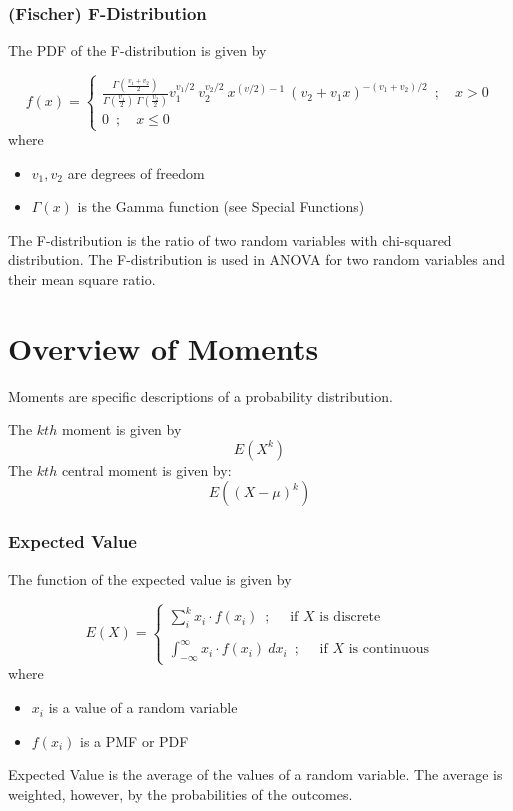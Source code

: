 \documentclass{article}
\begin{document}
\subsubsection{(Fischer) F-Distribution}

The PDF of the F-distribution is given by

$$ f(x) = \begin{cases} \frac{\Gamma (\frac{v_1 + v_2}{2}) }{ \Gamma (\frac{v_1}{2}) \:  \Gamma (\frac{v_2}{2})  } v_1^{v_1/2} \: v_2^{ v_2/2} \: x^{ (v / 2)-1 } \: (v_2 + v_1 x)^{-(v_1 + v_2)/2} \enspace ; \quad x > 0 \\ 0 \enspace ; \quad x \leq 0 \end{cases} $$
\hfill \break
where
\begin{itemize}
    \item $v_1, v_2$ are degrees of freedom
    \item $\Gamma(x)$ is the Gamma function (see Special Functions)
\end{itemize}
\hfill \break
The F-distribution is the ratio of two random variables with chi-squared distribution. The F-distribution is used in ANOVA for two random variables and their mean square ratio.



\newpage
\section{Overview of Moments}
Moments are specific descriptions of a probability distribution. 

\hfill \break
\hfill \break
The $kth$ moment is given by
$$ E(X^k) $$ \hfill \break
The $kth$ central moment is given by:
$$ E((X-\mu)^k) $$

\subsubsection{Expected Value}
The function of the expected value is given by

$$ E(X) = \begin{cases} \sum_{i}^{k} x_i \cdot f(x_i) \enspace ; \quad \text{ if } X \text{ is discrete} \\ \\ \int_{-\infty}^{\infty} x_i \cdot f(x_i) \: dx_i \enspace ; \quad \text{ if } X \text{ is continuous} \end{cases} $$ \hfill \break
where
\begin{itemize}
    \item $x_i$ is a value of a random variable
    \item $f(x_i)$ is a PMF or PDF
\end{itemize}
\hfill \break
Expected Value is the average of the values of a random variable. The average is weighted, however, by the probabilities of the outcomes.
\end{document}

